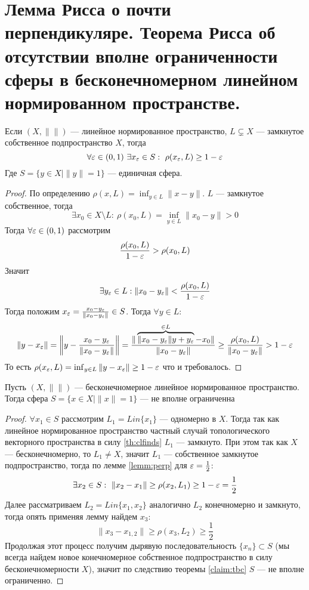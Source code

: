 \newpage
\section{Лемма Рисса о почти перпендикуляре. Теорема Рисса об отсутствии вполне ограниченности сферы в бесконечномерном линейном нормированном пространстве. }
\begin{lemma}
	\label{lemm:perp}
	Если $(X, \|\|)$ --- линейное нормированное пространство, $L \subsetneq X$ --- замкнутое собственное подпространство $X$, тогда
	$$
	\forall \varepsilon \in (0,1) \ \exists x_\varepsilon \in S: \ \rho(x_\varepsilon, L) \geq 1 - \varepsilon
	$$
	Где $S = \{y \in X \mid \|y \| = 1\}$ --- единичная сфера.
\end{lemma}
\begin{proof}
	По определению $\rho(x, L) = \inf_{y \in L} \| x - y\|$. $L$ --- замкнутое собственное, тогда 
	$$
	\exists x_0 \in X \setminus L: \ \rho(x_0, L) = \inf_{y \in L}\|x_0 - y\| > 0
	$$
	Тогда $\forall \varepsilon \in (0,1)$ рассмотрим 
	$$
	\frac{\rho(x_0, L)}{1 - \varepsilon} > \rho(x_0, L)
	$$
	Значит 
	$$\exists y_\varepsilon \in L: \|x_0 - y_\varepsilon\| < \frac{\rho(x_0, L)}{1 - \varepsilon}$$
	Тогда положим $x_\varepsilon = \frac{x_0 - y_\varepsilon}{\|x_0 - y_\varepsilon\|} \in S$. Тогда $\forall y \in L$:
	$$
	\|y - x_\varepsilon\| = \left\| y - \frac{x_0 - y_\varepsilon}{\|x_0 - y_\varepsilon\|}\right\| = \frac{\|\overbrace{\|x_0-y_\varepsilon\|y + y_\varepsilon}^{\in L}  - x_0 \|}{\|x_0 - y_\varepsilon\|} \geq \frac{\rho(x_0, L)}{\|x_0 - y_\varepsilon\|} > 1 - \varepsilon
	$$
	То есть $\rho(x_\varepsilon, L) = \inf_{y \in L}\|y - x_\varepsilon\| \geq 1 - \varepsilon$ что и требовалось.
\end{proof}
\begin{theorem}[Рисс]
	Пусть $(X, \| \|)$ --- бесконечномерное линейное нормированное пространство. Тогда сфера $S = \{x \in X \mid \|x\| = 1\}$ --- не вполне ограниченна
\end{theorem}
\begin{proof}
	$\forall x_1 \in S$ рассмотрим $L_1 = Lin \{x_1\}$ --- одномерно в $X$. Тогда так как  линейное нормированное пространство частный случай топологического векторного пространства в силу \ref{th:clfinds} $L_1$ --- замкнуто. При этом так как $X$ --- бесконечномерно, то $L_1 \neq X$, значит $L_1$ --- собственное замкнутое подпространство, тогда по лемме \ref{lemm:perp} для $\varepsilon = \frac{1}{2}$:
	$$
	\exists x_2 \in S: \ \|x_2 - x_1\| \geq \rho(x_2, L_1) \geq 1 - \varepsilon = \frac{1}{2}
	$$
	Далее рассматриваем $L_2 = Lin\{x_1, x_2\}$ аналогично $L_2$ конечномерно и замкнуто, тогда опять применяя лемму найдем $x_3$: 
	$$
	\|x_3 - x_{1,2}\| \geq \rho(x_3, L_2) \geq \frac{1}{2}
	$$
	Продолжая этот процесс получим дырявую последовательность $\{x_n\} \subset S$ (мы всегда найдем новое конечномерное собственное подпространство в силу бесконечномерности $X$), значит по следствию теоремы \ref{claim:tbc} $S$ --- не вполне ограниченно.
\end{proof}